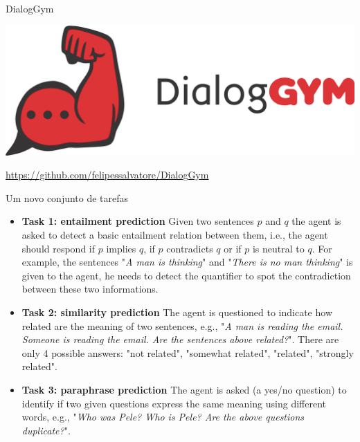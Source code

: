 \documentclass[10pt]{beamer}
\begin{document}
\begin{frame}{DialogGym}

\begin{center}
\includegraphics[scale=0.58]{images/DGred2.png}
\end{center}

\url{https://github.com/felipessalvatore/DialogGym}

\end{frame}


\begin{frame}{Um novo conjunto de tarefas}
\begin{itemize}
\item \textbf{Task 1: entailment prediction} Given two sentences $p$ and $q$ the agent is asked to detect a basic entailment relation between them, i.e., the agent should respond if $p$ implies $q$, if $p$ contradicts $q$ or if $p$ is neutral to $q$. For example, the sentences "\textit{A man is thinking}" and "\textit{There is no man thinking}" is given to the agent, he needs to detect the quantifier to spot the contradiction between these two informations.
\item \textbf{Task 2: similarity prediction} The agent is questioned to indicate how related are the meaning of two sentences, e.g., "\textit{A man is reading the email. Someone is reading the email. Are the sentences above related?}". There are only 4 possible answers: "not related", "somewhat related", "related", "strongly related". 
\item \textbf{Task 3: paraphrase prediction} The agent is asked (a yes/no question) to identify if two given questions express the same meaning using different words, e.g., "\textit{Who was Pele? Who is Pele? Are the above questions duplicate?}".
\end{itemize}
\end{frame}
\end{document}
